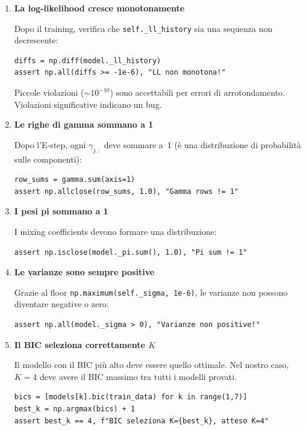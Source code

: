 \documentclass[11pt,a4paper]{article}
\begin{document}
\begin{enumerate}[label=\textbf{\arabic*.}, leftmargin=2em]

\item \textbf{La log-likelihood cresce monotonamente}

Dopo il training, verifica che \texttt{self.\_ll\_history} sia una
sequenza non decrescente:
\begin{lstlisting}[numbers=none]
diffs = np.diff(model._ll_history)
assert np.all(diffs >= -1e-6), "LL non monotona!"
\end{lstlisting}
Piccole violazioni ($\sim 10^{-10}$) sono accettabili per errori di
arrotondamento. Violazioni significative indicano un bug.

\item \textbf{Le righe di gamma sommano a 1}

Dopo l'E-step, ogni $\gamma_{j,:}$ deve sommare a~1 (è una
distribuzione di probabilità sulle componenti):
\begin{lstlisting}[numbers=none]
row_sums = gamma.sum(axis=1)
assert np.allclose(row_sums, 1.0), "Gamma rows != 1"
\end{lstlisting}

\item \textbf{I pesi pi sommano a 1}

I mixing coefficients devono formare una distribuzione:
\begin{lstlisting}[numbers=none]
assert np.isclose(model._pi.sum(), 1.0), "Pi sum != 1"
\end{lstlisting}

\item \textbf{Le varianze sono sempre positive}

Grazie al floor \texttt{np.maximum(self.\_sigma, 1e-6)}, le varianze
non possono diventare negative o zero:
\begin{lstlisting}[numbers=none]
assert np.all(model._sigma > 0), "Varianze non positive!"
\end{lstlisting}

\item \textbf{Il BIC seleziona correttamente $K$}

Il modello con il BIC più alto deve essere quello ottimale. Nel nostro
caso, $K=4$ deve avere il BIC massimo tra tutti i modelli provati.
\begin{lstlisting}[numbers=none]
bics = [models[k].bic(train_data) for k in range(1,7)]
best_k = np.argmax(bics) + 1
assert best_k == 4, f"BIC seleziona K={best_k}, atteso K=4"
\end{lstlisting}


\end{enumerate}
\end{document}
